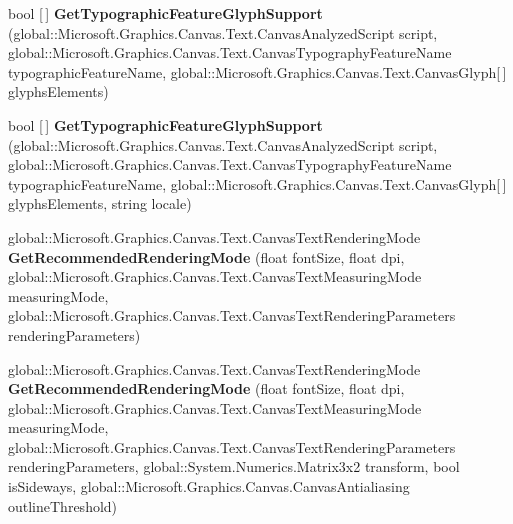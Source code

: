 \begin{DoxyCompactItemize}
\mbox{\label{interface_microsoft_1_1_graphics_1_1_canvas_1_1_text_1_1_i_canvas_font_face_a3ca04097c0081b708308456e13b4e899}} 
bool \mbox{[}$\,$\mbox{]} {\bfseries Get\+Typographic\+Feature\+Glyph\+Support} (global\+::\+Microsoft.\+Graphics.\+Canvas.\+Text.\+Canvas\+Analyzed\+Script script, global\+::\+Microsoft.\+Graphics.\+Canvas.\+Text.\+Canvas\+Typography\+Feature\+Name typographic\+Feature\+Name, global\+::\+Microsoft.\+Graphics.\+Canvas.\+Text.\+Canvas\+Glyph\mbox{[}$\,$\mbox{]} glyphs\+Elements)
\item 
\mbox{\label{interface_microsoft_1_1_graphics_1_1_canvas_1_1_text_1_1_i_canvas_font_face_a514a165ff64c3f1614b2f28786e28721}} 
bool \mbox{[}$\,$\mbox{]} {\bfseries Get\+Typographic\+Feature\+Glyph\+Support} (global\+::\+Microsoft.\+Graphics.\+Canvas.\+Text.\+Canvas\+Analyzed\+Script script, global\+::\+Microsoft.\+Graphics.\+Canvas.\+Text.\+Canvas\+Typography\+Feature\+Name typographic\+Feature\+Name, global\+::\+Microsoft.\+Graphics.\+Canvas.\+Text.\+Canvas\+Glyph\mbox{[}$\,$\mbox{]} glyphs\+Elements, string locale)
\item 
\mbox{\label{interface_microsoft_1_1_graphics_1_1_canvas_1_1_text_1_1_i_canvas_font_face_ae2ae5755a0eea0672afea0b62e974f44}} 
global\+::\+Microsoft.\+Graphics.\+Canvas.\+Text.\+Canvas\+Text\+Rendering\+Mode {\bfseries Get\+Recommended\+Rendering\+Mode} (float font\+Size, float dpi, global\+::\+Microsoft.\+Graphics.\+Canvas.\+Text.\+Canvas\+Text\+Measuring\+Mode measuring\+Mode, global\+::\+Microsoft.\+Graphics.\+Canvas.\+Text.\+Canvas\+Text\+Rendering\+Parameters rendering\+Parameters)
\item 
\mbox{\label{interface_microsoft_1_1_graphics_1_1_canvas_1_1_text_1_1_i_canvas_font_face_ad1b6a77bda7d882553aa0e86389e24c2}} 
global\+::\+Microsoft.\+Graphics.\+Canvas.\+Text.\+Canvas\+Text\+Rendering\+Mode {\bfseries Get\+Recommended\+Rendering\+Mode} (float font\+Size, float dpi, global\+::\+Microsoft.\+Graphics.\+Canvas.\+Text.\+Canvas\+Text\+Measuring\+Mode measuring\+Mode, global\+::\+Microsoft.\+Graphics.\+Canvas.\+Text.\+Canvas\+Text\+Rendering\+Parameters rendering\+Parameters, global\+::\+System.\+Numerics.\+Matrix3x2 transform, bool is\+Sideways, global\+::\+Microsoft.\+Graphics.\+Canvas.\+Canvas\+Antialiasing outline\+Threshold)

\end{DoxyCompactItemize}
